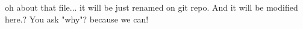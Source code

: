 oh
about that file...
it will be just renamed on git repo.
And it will be modified here.?
You ask "why"?
because we can!
